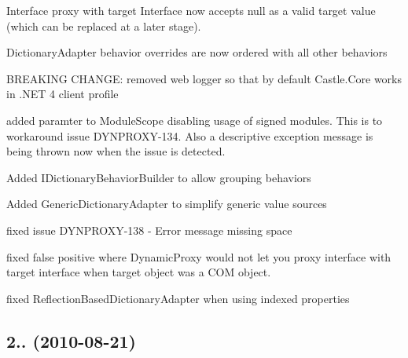 \begin{DoxyItemize}
\item Interface proxy with target Interface now accepts null as a valid target value (which can be replaced at a later stage).
\item Dictionary\+Adapter behavior overrides are now ordered with all other behaviors
\item B\+R\+E\+A\+K\+I\+NG C\+H\+A\+N\+GE\+: removed web logger so that by default Castle.\+Core works in .N\+ET 4 client profile
\item added paramter to Module\+Scope disabling usage of signed modules. This is to workaround issue D\+Y\+N\+P\+R\+O\+X\+Y-\/134. Also a descriptive exception message is being thrown now when the issue is detected.
\item Added I\+Dictionary\+Behavior\+Builder to allow grouping behaviors
\item Added Generic\+Dictionary\+Adapter to simplify generic value sources
\item fixed issue D\+Y\+N\+P\+R\+O\+X\+Y-\/138 -\/ Error message missing space
\item fixed false positive where Dynamic\+Proxy would not let you proxy interface with target interface when target object was a C\+OM object.
\item fixed Reflection\+Based\+Dictionary\+Adapter when using indexed properties
\end{DoxyItemize}

\subsection*{2.. (2010-\/08-\/21)}


